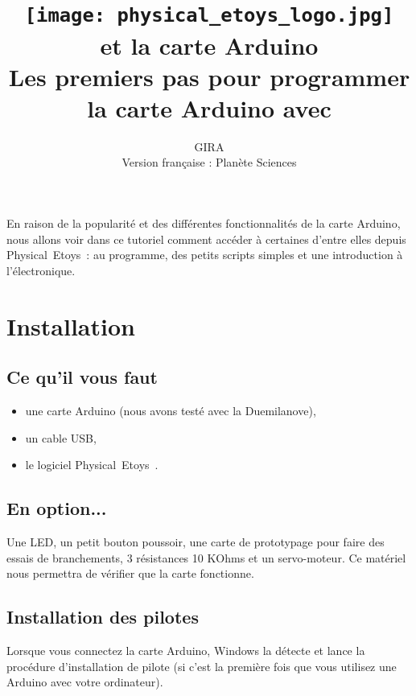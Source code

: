 \documentclass[a4paper,12pt]{article}
\title{
	\texttt{[image: physical\_etoys\_logo.jpg]}\\
	\vfill
	\vspace{3em}
	\LARGE{\textbf{\appName et la carte Arduino}}\\[1cm]
	\large{Les premiers pas pour programmer la carte Arduino avec \appName}\\[1cm]
	\vfill
}
\author{
GIRA \\
Version française : Planète Sciences
}
\def\appName{Physical~Etoys~}
\begin{document}

\maketitle

\cleardoublepage
\tableofcontents
\cleardoublepage

En raison de la popularité et des différentes fonctionnalités de la carte
Arduino, nous allons voir dans ce tutoriel comment accéder à certaines d'entre
elles depuis \appName : au programme, des petits scripts simples et une
introduction à l'électronique.

\section{Installation}

\subsection{Ce qu'il vous faut}

\begin{itemize}
        \item une carte Arduino (nous avons testé avec la Duemilanove),
        \item un cable USB,
        \item le logiciel \appName.
\end{itemize}


\subsection{En option...}

Une LED, un petit bouton poussoir, une carte de prototypage pour faire des
essais de branchements, 3 résistances 10 KOhms et un servo-moteur. Ce matériel
nous permettra de vérifier que la carte fonctionne. 

\subsection{Installation des pilotes}

Lorsque vous connectez la carte Arduino, Windows la détecte et lance la
procédure d'installation de pilote (si c'est la première fois que vous utilisez
une Arduino avec votre ordinateur).
\end{document}
